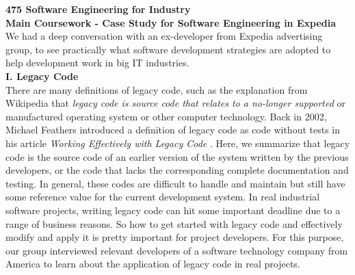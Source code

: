 \documentclass[11pt]{article}
\begin{document}
{\bf 475 Software Engineering for Industry} \\
{\bf Main Coursework - Case Study for Software Engineering in Expedia}\\[10px]
We had a deep conversation with an ex-developer from Expedia advertising group, to see practically what software development strategies are adopted to help development work in big IT industries. \\[10px]
{\bf I. Legacy Code}\\[10px]
There are many definitions of legacy code, such as the explanation from Wikipedia that \textit{legacy code is source code that relates to a no-longer supported} \cite{no1} or manufactured operating system or other computer technology. Back in 2002, Michael Feathers introduced a definition of legacy code as code without tests in his article \textit{Working Effectively with Legacy Code} \cite{no2}. Here, we summarize that legacy code is the source code of an earlier version of the system written by the previous developers, or the code that lacks the corresponding complete documentation and testing. In general, these codes are difficult to handle and maintain but still have some reference value for the current development system. In real industrial software projects, writing legacy code can hit some important deadline due to a range of business reasons. So how to get started with legacy code and effectively modify and apply it is pretty important for project developers. For this purpose, our group interviewed relevant developers of a software technology company from America to learn about the application of legacy code in real projects. \\[10px]
\end{document}
